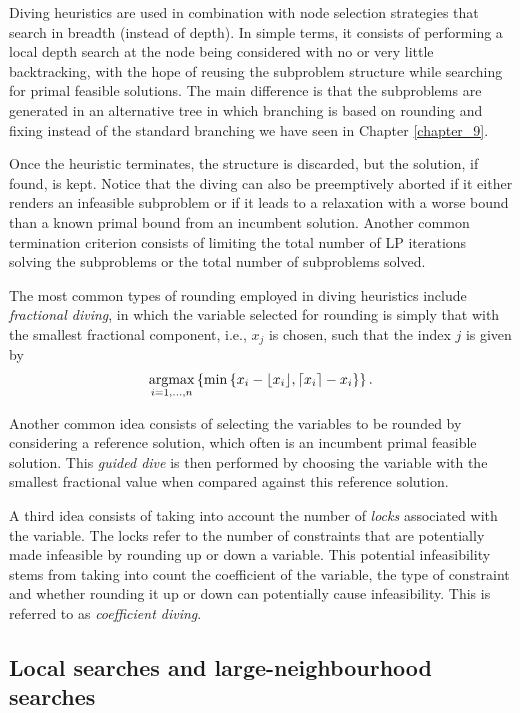 Diving heuristics are used in combination with node selection strategies that search in breadth (instead of depth). In simple terms, it consists of performing a local depth search at the node being considered with no or very little backtracking, with the hope of reusing the subproblem structure while searching for primal feasible solutions. The main difference is that the subproblems are generated in an alternative tree in which branching is based on rounding and fixing instead of the standard branching we have seen in Chapter \ref{chapter_9}. 

Once the heuristic terminates, the structure is discarded, but the solution, if found, is kept. Notice that the diving can also be preemptively aborted if it either renders an infeasible subproblem or if it leads to a relaxation with a worse bound than a known primal bound from an incumbent solution. Another common termination criterion consists of limiting the total number of LP iterations solving the subproblems or the total number of subproblems solved. 

The most common types of rounding employed in diving heuristics include \emph{fractional diving}, in which the variable selected for rounding is simply that with the smallest fractional component, i.e., $x_j$ is chosen, such that the index $j$ is given by
%
\begin{equation*}
	\mathop{\rm argmax}_{i=1,\dots,n} \left\{ \min\left\{ x_i-\lfloor x_i\rfloor, \lceil x_i \rceil - x_i \right \} \right \}.	
\end{equation*}

Another common idea consists of selecting the variables to be rounded by considering a reference solution, which often is an incumbent primal feasible solution. This \emph{guided dive} is then performed by choosing the variable with the smallest fractional value when compared against this reference solution. 

A third idea consists of taking into account the number of \emph{locks} associated with the variable. The locks refer to the number of constraints that are potentially made infeasible by rounding up or down a variable. This potential infeasibility stems from taking into count the coefficient of the variable, the type of constraint and whether rounding it up or down can potentially cause infeasibility. This is referred to as \emph{coefficient diving}.


\subsection{Local searches and large-neighbourhood searches}

